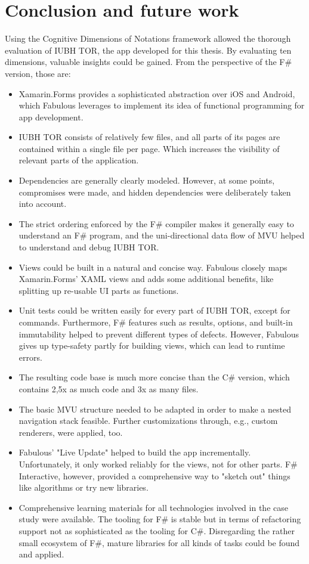 \section{Conclusion and future work}

Using the Cognitive Dimensions of Notations framework allowed the thorough evaluation of IUBH TOR, the app developed for this thesis. By evaluating ten dimensions, valuable insights could be gained. From the perspective of the F\# version, those are:

\begin{itemize}
\item Xamarin.Forms provides a sophisticated abstraction over iOS and Android, which Fabulous leverages to implement its idea of functional programming for app development.
\item IUBH TOR consists of relatively few files, and all parts of its pages are contained within a single file per page. Which increases the visibility of relevant parts of the application.
\item Dependencies are generally clearly modeled. However, at some points, compromises were made, and hidden dependencies were deliberately taken into account.
\item The strict ordering enforced by the F\# compiler makes it generally easy to understand an F\# program, and the uni-directional data flow of MVU helped to understand and debug IUBH TOR.
\item Views could be built in a natural and concise way. Fabulous closely maps Xamarin.Forms' XAML views and adds some additional benefits, like splitting up re-usable UI parts as functions.
\item Unit tests could be written easily for every part of IUBH TOR, except for commands. Furthermore, F\# features such as results, options, and built-in immutability helped to prevent different types of defects. However, Fabulous gives up type-safety partly for building views, which can lead to runtime errors.
\item The resulting code base is much more concise than the C\# version, which contains 2,5x as much code and 3x as many files.
\item The basic MVU structure needed to be adapted in order to make a nested navigation stack feasible. Further customizations through, e.g., custom renderers, were applied, too.
\item Fabulous' "Live Update" helped to build the app incrementally. Unfortunately, it only worked reliably for the views, not for other parts. F\# Interactive, however, provided a comprehensive way to "sketch out" things like algorithms or try new libraries.
\item Comprehensive learning materials for all technologies involved in the case study were available. The tooling for F\# is stable but in terms of refactoring support not as sophisticated as the tooling for C\#. Disregarding the rather small ecosystem of F\#, mature libraries for all kinds of tasks could be found and applied.
\end{itemize}

